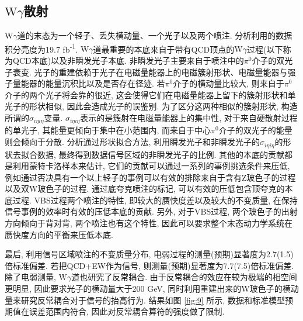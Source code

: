 \documentclass{SCIS2020cn}
\newcommand{\Wboson}{\text{W}}
\begin{document}
\subsection{$\Wboson\gamma$散射}
\label{sec:3.2}

$\Wboson\gamma$道的末态为一个轻子、丢失横动量、一个光子以及两个喷注. 分析利用的数据积分亮度为19.7 fb\textsuperscript{-1}. $\Wboson\gamma$道最重要的本底来自于带有QCD顶点的$\Wboson\gamma$过程(以下称为QCD本底)以及非瞬发光子本底. 非瞬发光子主要来自于喷注中的$\pi^0$介子的双光子衰变. 光子的重建依赖于光子在电磁量能器上的电磁簇射形状、电磁量能器与强子量能器的能量沉积比以及是否存在径迹. 若$\pi^0$介子的横动量比较大, 则来自于$\pi^0$介子的两个光子将会靠的很近, 这会使得它们在电磁量能器上留下的簇射形状和单光子的形状相似, 因此会造成光子的误鉴别. 为了区分这两种相似的簇射形状, 构造所谓的$\sigma_{i \eta i \eta}$变量. $\sigma_{i \eta i \eta}$表示的是簇射在电磁量能器上的集中性, 对于来自硬散射过程的单光子, 其能量更倾向于集中在小范围内, 而来自于中心$\pi^0$介子的双光子的能量则会倾向于分散. 分析通过形状拟合方法, 利用瞬发光子和非瞬发光子的$\sigma_{i \eta i \eta}$的形状去拟合数据, 最终得到数据信号区域的非瞬发光子的比例. 其他的本底的贡献都是利用蒙特卡洛样本来估计, 它们的贡献可以通过一系列的事例挑选条件来压低, 例如通过否决具有一个以上轻子的事例可以有效的排除来自于含有Z玻色子的过程以及双W玻色子的过程. 通过底夸克喷注的标记, 可以有效的压低包含顶夸克的本底过程. VBS过程两个喷注的特性, 即较大的赝快度差以及较大的不变质量, 在保持信号事例的效率时有效的压低本底的贡献. 另外, 对于VBS过程, 两个玻色子的出射方向倾向于背对背, 两个喷注也有这个特性, 因此可以要求整个末态动力学系统在赝快度方向的平衡来压低本底. 

最后, 利用信号区域喷注的不变质量分布, 电弱过程的测量(预期)显著度为2.7(1.5)倍标准偏差. 若把QCD+EW作为信号, 则测量(预期)显著度为7.7(7.5)倍标准偏差. 除了电弱测量, $\Wboson\gamma$道也研究了反常耦合. 由于反常耦合的效应在较为极端的相空间更明显, 因此要求光子的横动量大于200 GeV, 同时利用重建出来的W玻色子的横动量来研究反常耦合对于信号的抬高行为. 结果如图 \ref{fig:9} 所示, 数据和标准模型预期值在误差范围内符合, 因此对反常耦合算符的强度做了限制. 
\end{document}
